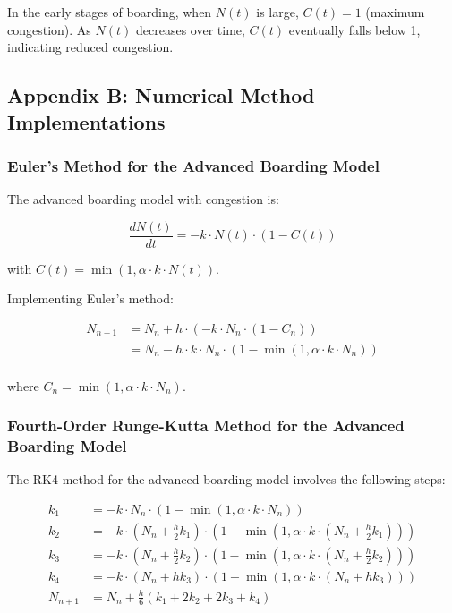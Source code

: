 In the early stages of boarding, when $N(t)$ is large, $C(t) = 1$ (maximum congestion). As $N(t)$ decreases over time, $C(t)$ eventually falls below 1, indicating reduced congestion.

\subsection{Appendix B: Numerical Method Implementations}

\subsubsection{Euler's Method for the Advanced Boarding Model}

The advanced boarding model with congestion is:

\begin{equation}
\frac{dN(t)}{dt} = -k \cdot N(t) \cdot (1 - C(t))
\end{equation}

with $C(t) = \min\left(1, \alpha \cdot k \cdot N(t) \right)$.

Implementing Euler's method:

\begin{align}
N_{n+1} &= N_n + h \cdot (-k \cdot N_n \cdot (1 - C_n)) \\
&= N_n - h \cdot k \cdot N_n \cdot (1 - \min(1, \alpha \cdot k \cdot N_n)) \\
\end{align}

where $C_n = \min(1, \alpha \cdot k \cdot N_n)$.

\subsubsection{Fourth-Order Runge-Kutta Method for the Advanced Boarding Model}

The RK4 method for the advanced boarding model involves the following steps:

\begin{align}
k_1 &= -k \cdot N_n \cdot (1 - \min(1, \alpha \cdot k \cdot N_n)) \\
k_2 &= -k \cdot (N_n + \frac{h}{2} k_1) \cdot (1 - \min(1, \alpha \cdot k \cdot (N_n + \frac{h}{2} k_1))) \\
k_3 &= -k \cdot (N_n + \frac{h}{2} k_2) \cdot (1 - \min(1, \alpha \cdot k \cdot (N_n + \frac{h}{2} k_2))) \\
k_4 &= -k \cdot (N_n + h k_3) \cdot (1 - \min(1, \alpha \cdot k \cdot (N_n + h k_3))) \\
N_{n+1} &= N_n + \frac{h}{6}(k_1 + 2k_2 + 2k_3 + k_4)
\end{align}

